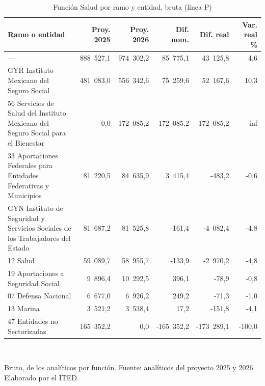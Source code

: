 \begin{table}[htbp]
\centering
\scriptsize
\caption{Función Salud por ramo y entidad, bruta (línea P)}
\label{cua:C5_1}
\begin{tabular}{p{6.2cm}rrrrr}
\toprule
\textbf{Ramo o entidad} & \textbf{Proy. 2025} & \textbf{Proy. 2026} & \textbf{Dif. nom.} & \textbf{Dif. real} & \textbf{Var. real \%} \\
\midrule
--- & 888 527,1 & 974 302,2 & 85 775,1 & 43 125,8 & 4,6 \\
GYR Instituto Mexicano del Seguro Social & 481 083,0 & 556 342,6 & 75 259,6 & 52 167,6 & 10,3 \\
56 Servicios de Salud del Instituto Mexicano del Seguro Social para el Bienestar & 0,0 & 172 085,2 & 172 085,2 & 172 085,2 & inf \\
33 Aportaciones Federales para Entidades Federativas y Municipios & 81 220,5 & 84 635,9 & 3 415,4 & -483,2 & -0,6 \\
GYN Instituto de Seguridad y Servicios Sociales de los Trabajadores del Estado & 81 687,2 & 81 525,8 & -161,4 & -4 082,4 & -4,8 \\
12 Salud & 59 089,7 & 58 955,7 & -133,9 & -2 970,2 & -4,8 \\
19 Aportaciones a Seguridad Social & 9 896,4 & 10 292,5 & 396,1 & -78,9 & -0,8 \\
07 Defensa Nacional & 6 677,0 & 6 926,2 & 249,2 & -71,3 & -1,0 \\
13 Marina & 3 521,2 & 3 538,4 & 17,2 & -151,8 & -4,1 \\
47 Entidades no Sectorizadas & 165 352,2 & 0,0 & -165 352,2 & -173 289,1 & -100,0 \\
\bottomrule
\end{tabular}
\\[2pt]\begin{minipage}{0.92\textwidth}\scriptsize Bruto, de los analíticos por función. Fuente: analíticos del proyecto 2025 y 2026. Elaborado por el ITED.\end{minipage}
\end{table}

